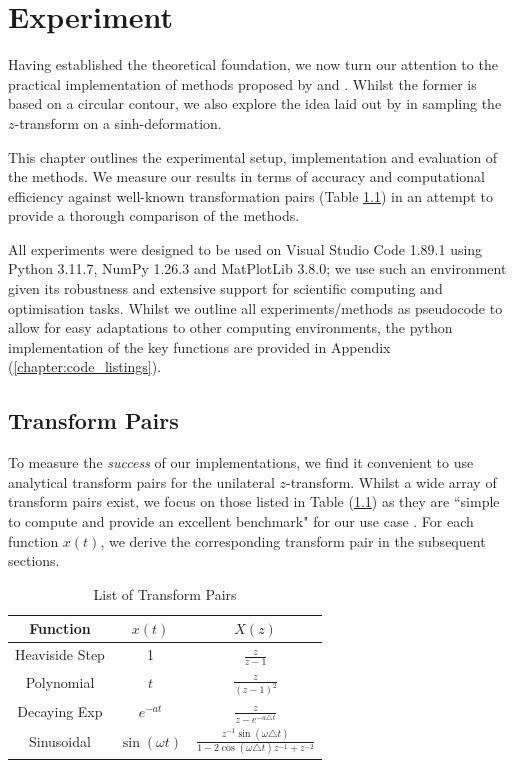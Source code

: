 \documentclass[a4paper]{report}
\begin{document}
\chapter{Experiment}
Having established the theoretical foundation, we now turn our attention to the practical implementation of methods proposed by \citet{AbateWhitt1992a, AbateWhitt1992b} and \citet{Cavers1978FFT}. Whilst the former is based on a circular contour, we also explore the idea laid out by \citet{levendorskii2022sinh} in sampling the $z$-transform on a sinh-deformation.

This chapter outlines the experimental setup, implementation and evaluation of the methods. We measure our results in terms of accuracy and computational efficiency against well-known transformation pairs (Table \ref{table:transform_pairs}) in an attempt to provide a thorough comparison of the methods.

All experiments were designed to be used on Visual Studio Code 1.89.1 using Python 3.11.7, NumPy 1.26.3 and MatPlotLib 3.8.0; we use such an environment given its robustness and extensive support for scientific computing and optimisation tasks. Whilst we outline all experiments/methods as pseudocode to allow for easy adaptations to other computing environments, the python implementation of the key functions are provided in Appendix (\ref{chapter:code_listings}).

\section{Transform Pairs}
To measure the \textit{success} of our implementations, we find it convenient to use analytical transform pairs for the unilateral $z$-transform. Whilst a wide array of transform pairs exist, we focus on those listed in Table (\ref{table:transform_pairs}) as they are ``simple to compute and provide an excellent benchmark" for our use case \citep{loveless2021guido}. For each function $x(t)$, we derive the corresponding transform pair in the subsequent sections.

\begin{table}[H]
    \centering
    \renewcommand{\arraystretch}{1.2} %
    \begin{tabular}{c|cc}
    \textbf{Function} & $x(t)$ & $X(z)$ \\
    \hline
    Heaviside Step & 1 & $\frac{z}{z-1}$ \\
    Polynomial & $t$ & $\frac{z}{(z-1)^2}$ \\
    Decaying Exp & $e^{-at}$ & $\frac{z}{z - e^{-a \triangle t}}$ \\
    Sinusoidal & $\sin(\omega t)$ & $\frac{z^{-1}\sin(\omega \triangle t)}{1 - 2\cos(\omega\triangle t)z^{-1} + z^{-2}}$ \\
    \end{tabular}
    
    \caption{List of Transform Pairs}
    \label{table:transform_pairs}
\end{table}
\end{document}
